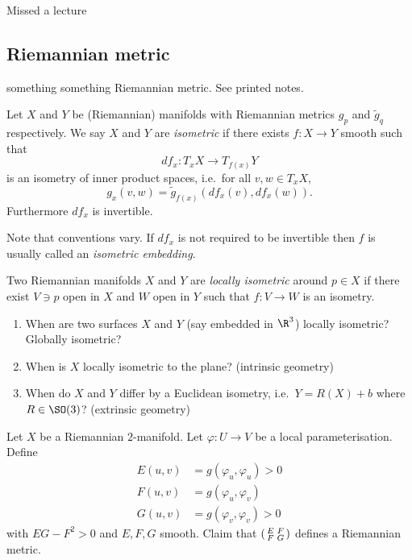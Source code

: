 \documentclass[a4paper]{article}
\begin{document}
Missed a lecture

\subsection{Riemannian metric}

something something Riemannian metric. See printed notes.

\begin{definition}[Isometry]
  Let \(X\) and \(Y\) be (Riemannian) manifolds with Riemannian metrics \(g_p\) and \(\tilde g_q\) respectively. We say \(X\) and \(Y\) are \emph{isometric} if there exists \(f: X \to Y\) smooth such that
  \[
    df_x: T_xX \to T_{f(x)}Y
  \]
  is an isometry of inner product spaces, i.e.\ for all \(v, w \in T_xX\),
  \[
    g_x(v, w) = \tilde g_{f(x)}(df_x(v), df_x(w)).
  \]
  Furthermore \(df_x\) is invertible.
\end{definition}

Note that conventions vary. If \(df_x\) is not required to be invertible then \(f\) is usually called an \emph{isometric embedding}.

\begin{definition}
  Two Riemannian manifolds \(X\) and \(Y\) are \emph{locally isometric} around \(p \in X\) if there exist \(V \ni p\) open in \(X\) and \(W\) open in \(Y\) such that \(f: V \to W\) is an isometry.
\end{definition}

\begin{question}\leavevmode
  \begin{enumerate}
  \item When are two surfaces \(X\) and \(Y\) (say embedded in \(\R^3\)) locally isometric? Globally isometric?
  \item When is \(X\) locally isometric to the plane? (intrinsic geometry)
  \item When do \(X\) and \(Y\) differ by a Euclidean isometry, i.e.\ \(Y = R(X) + b\) where \(R \in \SO(3)\)? (extrinsic geometry)
  \end{enumerate}
\end{question}

Let \(X\) be a Riemannian \(2\)-manifold. Let \(\varphi: U \to V\) be a local parameterisation. Define
\begin{align*}
  E(u, v) &= g(\varphi_u, \varphi_u) > 0 \\
  F(u, v) &= g(\varphi_u, \varphi_v) \\
  G(u, v) &= g(\varphi_v, \varphi_v) > 0
\end{align*}
with \(EG - F^2 > 0\) and \(E, F, G\) smooth. Claim that \(\begin{psmallmatrix} E & F \\ F & G \end{psmallmatrix}\) defines a Riemannian metric.
\end{document}

